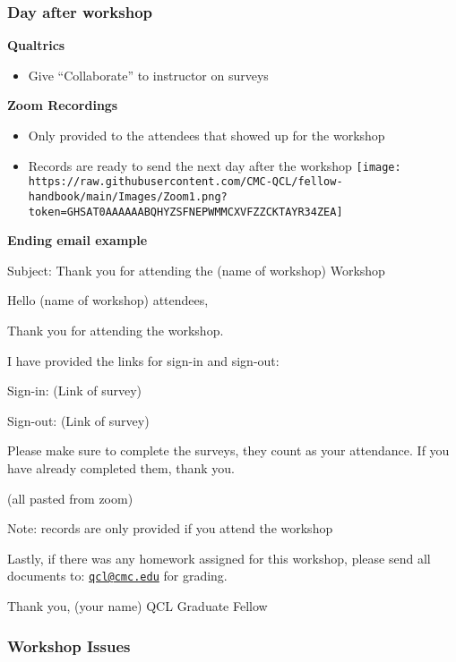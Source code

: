 \documentclass[
]{book}
\providecommand{\tightlist}{%
  \setlength{\itemsep}{0pt}\setlength{\parskip}{0pt}}
\begin{document}
\hypertarget{day-after-workshop}{%
\subsubsection{\texorpdfstring{Day after workshop }{Day after workshop }}\label{day-after-workshop}}

\textbf{Qualtrics}

\begin{itemize}
\tightlist
\item
  Give ``Collaborate'' to instructor on surveys
\end{itemize}

\textbf{Zoom Recordings}

\begin{itemize}
\tightlist
\item
  Only provided to the attendees that showed up for the workshop
\item
  Records are ready to send the next day after the workshop
  \texttt{[image: https://raw.githubusercontent.com/CMC-QCL/fellow-handbook/main/Images/Zoom1.png?token=GHSAT0AAAAAABQHYZSFNEPWMMCXVFZZCKTAYR34ZEA]}
\end{itemize}

\textbf{Ending email example}

Subject: Thank you for attending the (name of workshop) Workshop

Hello (name of workshop) attendees,

Thank you for attending the workshop.

I have provided the links for sign-in and sign-out:

Sign-in:
(Link of survey)

Sign-out:
(Link of survey)

Please make sure to complete the surveys, they count as your attendance. If you have already completed them, thank you.

(all pasted from zoom)

Note: records are only provided if you attend the workshop

Lastly, if there was any homework assigned for this workshop, please send all documents to: \href{mailto:qcl@cmc.edu}{\nolinkurl{qcl@cmc.edu}} for grading.

Thank you,
(your name)
QCL Graduate Fellow

\hypertarget{workshop-issues}{%
\subsubsection{\texorpdfstring{Workshop Issues }{Workshop Issues }}\label{workshop-issues}}
\end{document}
